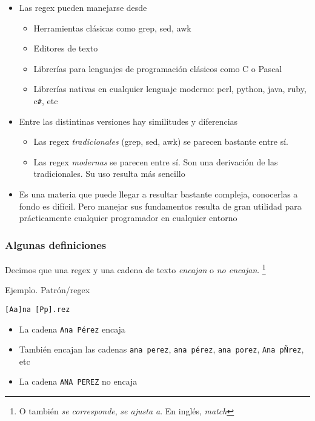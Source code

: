 \documentclass[ucs]{beamer}
\begin{document}
\begin{frame}[fragile]
\begin{itemize}
\item
Las regex pueden manejarse desde
\begin{itemize}
\item
Herramientas clásicas como grep, sed, awk
\item
Editores de texto
\item
Librerías para lenguajes de programación clásicos como C o Pascal
\item
Librerías nativas en cualquier lenguaje moderno: perl, python,
java, ruby, c\verb|#|, etc
\end{itemize}
\item
Entre las distintinas versiones hay similitudes y diferencias

\begin{itemize}
\item
Las regex \emph{tradicionales} (grep, sed, awk) se parecen bastante entre sí.
\item
Las regex \emph{modernas} se parecen entre sí. Son una derivación de las tradicionales.
Su uso resulta más sencillo
\end{itemize}

\item
Es una materia que puede llegar a resultar bastante compleja,
conocerlas a fondo es difícil. Pero manejar sus fundamentos
resulta de gran utilidad para prácticamente cualquier
programador en cualquier entorno
\end{itemize}

\end{frame}


\begin{frame}[fragile]
\frametitle{Algunas definiciones}
Decimos que
una regex y una cadena de texto \emph{encajan} o \emph{no encajan}.
\footnote{O también \emph{se corresponde}, 
\emph{se ajusta a}. En inglés, \emph{match}}

Ejemplo. Patrón/regex 

\begin{center}
\verb|[Aa]na [Pp].rez|
\end{center}

\begin{itemize}
\item
La cadena
\verb|Ana Pérez|
encaja

\item
También encajan las cadenas 
\verb|ana perez|,
\verb|ana pérez|,
\verb|ana porez|,
\verb|Ana pÑrez|, etc
\item
La cadena \verb|ANA PEREZ| no encaja 
\end{itemize}

\end{frame}
\end{document}
